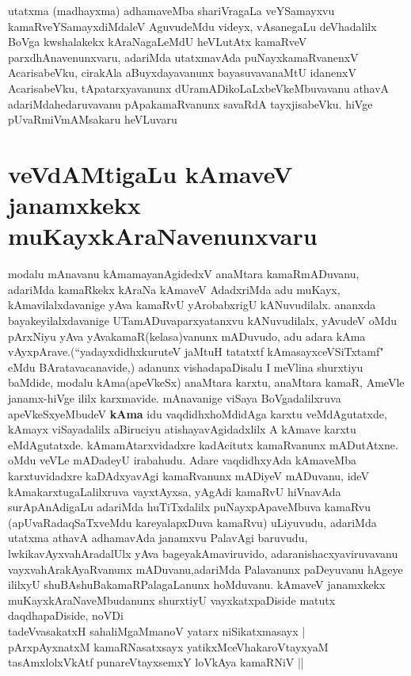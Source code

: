 \begin{artha}
utatxma (madhayxma) adhamaveMba shariVragaLa veYSamayxvu kamaRveYSamayxdiMdaleV AguvudeMdu videyx, vAsanegaLu deVhadalilx BoVga kwshalakekx kAraNagaLeMdU heVLutAtx kamaRveV parxdhAnavenunxvaru, adariMda utatxmavAda puNayxkamaRvanenxV AcarisabeVku, cirakAla aBuyxdayavanunx bayasuvavanaMtU idanenxV AcarisabeVku, tApa\-tarxyavanunx dUramADikoLaLxbeVkeMbuvavanu athavA adariMda\break hedaruvavanu pApakamaRvanunx savaRdA tayxjisabeVku. hiVge pUvaRmiVmAMsakaru heVLuvaru
\end{artha}

\section*{veVdAMtigaLu kAmaveV janamxkekx muKayxkAraNavenunxvaru}


\begin{artha}
modalu mAnavanu kAmamayanAgidedxV anaMtara kamaRmADuvanu, adariMda kamaRkekx kAraNa kAmaveV AdadxriMda adu muKayx, kAmavilalxdavanige yAva kamaRvU yArobabxrigU kANuvudilalx. ananxda bayakeyilalxdavanige UTamADuvaparxyatanxvu kANuvudilalx, yAvudeV oMdu pArxNiyu  yAva yAvakamaR\-\break (kelasa)vanunx mADuvudo, adu adara kAma vAyxpArave.\break (``yadayxdidhxkuruteV jaMtuH tatatxtf kAmasayxceVSiTxtamf" eMdu BAratavacanavide,) adanunx vishadapaDisalu I meVlina shurxtiyu baMdide, modalu kAma(apeVkeSx) anaMtara karxtu, anaMtara kamaR, AmeVle janamx-hiVge ililx karxmavide.
mAnavanige viSaya BoVgadalilxruva apeVkeSxyeMbudeV \textbf{kAma} idu vaqdidhxhoMdidAga karxtu veMdAgutatxde, kAmayx viSayadalilx aBiruciyu atishayavAgidadxlilx A kAmave karxtu eMdAgutatxde. kAmamAtarxvidadxre kadAcitutx kamaRvanunx mADutAtxne. oMdu veVLe  mADadeyU irabahudu. Adare vaqdidhxyAda kAmaveMba karxtuvidadxre kaDAdxyavAgi kamaRvanunx mADiyeV mADuvanu, ideV kAmakarxtugaLalilxruva vayxtAyxsa, yAgAdi kamaRvU hiVnavAda surApAnAdigaLu adariMda huTiTxdalilx puNayxpApaveMbuva kamaRvu (apUvaRadaqSaTxveMdu kareyalapxDuva kamaRvu) uLiyuvudu, adariMda utatxma athavA adhamavAda janamxvu PalavAgi baruvudu, lwkikavAyxvahAradalUlx yAva bageyakAmaviruvido, adaranishacxyaviruvavanu vayxvahArakAyaRvanunx mADuvanu,\break adariMda Palavanunx paDeyuvanu hAgeye ililxyU shuBAshuBakamaRPalagaLanunx hoMduvanu. kAmaveV janamxkekx muKayxkAraNa\-\break veMbudanunx shurxtiyU vayxkatxpaDiside matutx daqdhapaDiside, noVDi\ndash \\
tadeVvasakatxH sahaliMgaMmanoV yatarx niSikatxmasayx |\\
pArxpAyxnatxM kamaRNasatxsayx yatikxMceVhakaroVtayxyaM\\ 
tasAmxlolxVkAtf punareVtayxsemxY loVkAya kamaRNiV ||
\end{artha}

